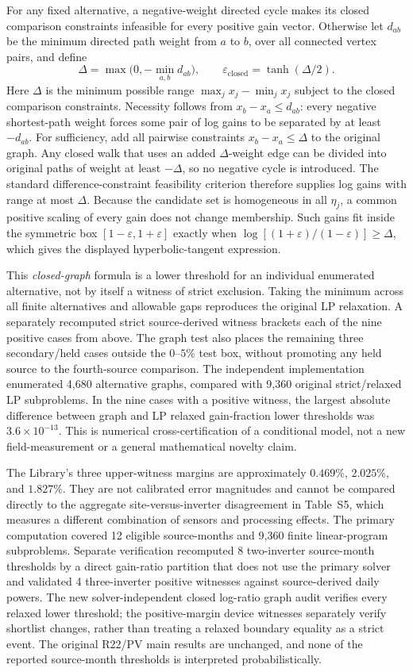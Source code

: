 \documentclass[11pt]{article}
\begin{document}
For any fixed alternative, a negative-weight directed cycle makes its closed comparison constraints infeasible for every positive gain vector. Otherwise let $d_{ab}$ be the minimum directed path weight from $a$ to $b$, over all connected vertex pairs, and define
\[
  \Delta=\max\bigl(0,-\min_{a,b}d_{ab}\bigr),
  \qquad
  \varepsilon_{\mathrm{closed}}=\tanh(\Delta/2).
\]
Here $\Delta$ is the minimum possible range $\max_jx_j-\min_jx_j$ subject to the closed comparison constraints. Necessity follows from $x_b-x_a\le d_{ab}$: every negative shortest-path weight forces some pair of log gains to be separated by at least $-d_{ab}$. For sufficiency, add all pairwise constraints $x_b-x_a\le\Delta$ to the original graph. Any closed walk that uses an added $\Delta$-weight edge can be divided into original paths of weight at least $-\Delta$, so no negative cycle is introduced. The standard difference-constraint feasibility criterion therefore supplies log gains with range at most $\Delta$. Because the candidate set is homogeneous in all $\eta_j$, a common positive scaling of every gain does not change membership. Such gains fit inside the symmetric box $[1-\varepsilon,1+\varepsilon]$ exactly when $\log[(1+\varepsilon)/(1-\varepsilon)]\ge\Delta$, which gives the displayed hyperbolic-tangent expression.

This \emph{closed-graph} formula is a lower threshold for an individual enumerated alternative, not by itself a witness of strict exclusion. Taking the minimum across all finite alternatives and allowable gaps reproduces the original LP relaxation. A separately recomputed strict source-derived witness brackets each of the nine positive cases from above. The graph test also places the remaining three secondary/held cases outside the $0$--$5\%$ test box, without promoting any held source to the fourth-source comparison. The independent implementation enumerated 4,680 alternative graphs, compared with 9,360 original strict/relaxed LP subproblems. In the nine cases with a positive witness, the largest absolute difference between graph and LP relaxed gain-fraction lower thresholds was $3.6\times10^{-13}$. This is numerical cross-certification of a conditional model, not a new field-measurement or a general mathematical novelty claim.

The Library's three upper-witness margins are approximately $0.469\%$, $2.025\%$, and $1.827\%$. They are not calibrated error magnitudes and cannot be compared directly to the aggregate site-versus-inverter disagreement in Table~S5, which measures a different combination of sensors and processing effects. The primary computation covered 12 eligible source-months and 9,360 finite linear-program subproblems. Separate verification recomputed 8 two-inverter source-month thresholds by a direct gain-ratio partition that does not use the primary solver and validated 4 three-inverter positive witnesses against source-derived daily powers. The new solver-independent closed log-ratio graph audit verifies every relaxed lower threshold; the positive-margin device witnesses separately verify shortlist changes, rather than treating a relaxed boundary equality as a strict event. The original R22/PV main results are unchanged, and none of the reported source-month thresholds is interpreted probabilistically.
\end{document}
